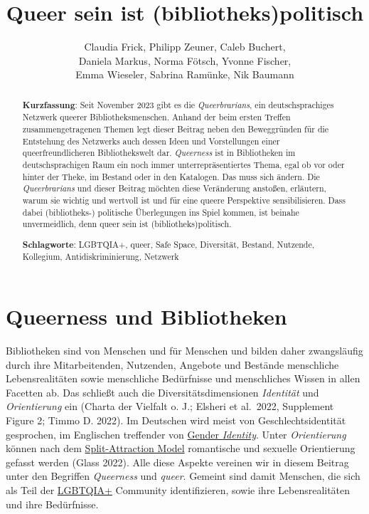 \documentclass[a4paper,
fontsize=11pt,
oneside,
numbers=noperiodatend,
parskip=half-,
bibliography=totoc,
final
]{scrartcl}
\title{\LARGE{Queer sein ist (bibliotheks)politisch}}%
\author{Claudia Frick, Philipp Zeuner, Caleb Buchert,\\ Daniela Markus, Norma Fötsch, Yvonne Fischer,\\ Emma Wieseler, Sabrina Ramünke, Nik Baumann} %
\date{}
\begin{document}
\maketitle
\thispagestyle{fancyplain} 

\begin{abstract}
\noindent
\textbf{Kurzfassung}: Seit November 2023 gibt es die \textit{Queerbrarians}, ein 
deutschsprachiges Netzwerk queerer Bibliotheksmenschen. Anhand der beim 
ersten Treffen zusammengetragenen Themen legt dieser Beitrag neben den Beweggründen 
für die Entstehung des Netzwerks auch dessen Ideen und Vorstellungen einer 
queerfreundlicheren Bibliothekswelt dar. \textit{Queerness} ist in Bibliotheken im 
deutschsprachigen Raum ein noch immer unterrepräsentiertes Thema, egal ob vor 
oder hinter der Theke, im Bestand oder in den Katalogen. Das muss sich ändern. 
Die \textit{Queerbrarians} und dieser Beitrag möchten diese Veränderung anstoßen, erläutern, 
warum sie wichtig und wertvoll ist und für eine queere Perspektive sensibilisieren. 
Dass dabei (bibliotheks-) politische Überlegungen ins Spiel kommen, ist beinahe 
unvermeidlich, denn queer sein ist (bibliotheks)politisch.
\end{abstract}

\begin{abstract}
\noindent
\textbf{Schlagworte}: LGBTQIA+, queer, Safe Space, Diversität, Bestand, Nutzende, Kollegium, Antidiskriminierung, Netzwerk
\end{abstract}

\section{Queerness und
Bibliotheken}\label{queerness-und-bibliotheken}

Bibliotheken sind von Menschen und für Menschen und bilden daher
zwangsläufig durch ihre Mitarbeitenden, Nutzenden, Angebote und Bestände
menschliche Lebensrealitäten sowie menschliche Bedürfnisse und
menschliches Wissen in allen Facetten ab. Das schließt auch die
Diversitätsdimensionen \emph{Identität} und \emph{Orientierung} ein
(Charta der Vielfalt o. J.; Elsheri et al.~2022, Supplement Figure 2;
Timmo D. 2022). Im Deutschen wird meist von Geschlechtsidentität
gesprochen, im Englischen treffender von
\href{https://lgbtqia.fandom.com/wiki/Gender_identity}{Gender
\emph{Identity}}. Unter \emph{Orientierung} können nach dem
\href{https://lgbtqia.mywikis.wiki/wiki/Split_Attraction_Model}{Split-Attraction
Model} romantische und sexuelle Orientierung gefasst werden (Glass
2022). Alle diese Aspekte vereinen wir in diesem Beitrag unter den
Begriffen \emph{Queerness} und \emph{queer}. Gemeint sind damit
Menschen, die sich als Teil der
\href{https://lgbtqia.mywikis.wiki/wiki/LGBT}{LGBTQIA+} Community
identifizieren, sowie ihre Lebensrealitäten und ihre Bedürfnisse.
\end{document}
